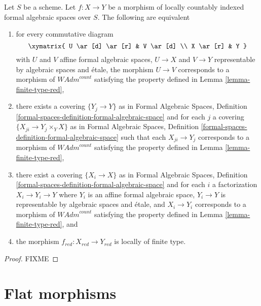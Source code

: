 \begin{lemma}
\label{lemma-finite-type-red-morphisms}
Let $S$ be a scheme. Let $f : X \to Y$ be a morphism of
locally countably indexed formal algebraic spaces over $S$.
The following are equivalent
\begin{enumerate}
\item for every commutative diagram
$$
\xymatrix{
U \ar[d] \ar[r] & V \ar[d] \\
X \ar[r] & Y
}
$$
with $U$ and $V$ affine formal algebraic spaces, $U \to X$ and $V \to Y$
representable by algebraic spaces and \'etale, the morphism $U \to V$
corresponds to a morphism of $\textit{WAdm}^{count}$ satisfying the
property defined in Lemma \ref{lemma-finite-type-red},
\item there exists a covering $\{Y_j \to Y\}$ as in
Formal Algebraic Spaces,
Definition \ref{formal-spaces-definition-formal-algebraic-space}
and for each $j$
a covering $\{X_{ji} \to Y_j \times_Y X\}$ as in
Formal Algebraic Spaces,
Definition \ref{formal-spaces-definition-formal-algebraic-space}
such that each $X_{ji} \to Y_j$  corresponds
to a morphism of $\textit{WAdm}^{count}$ satisfying the
property defined in Lemma \ref{lemma-finite-type-red},
\item there exist a covering $\{X_i \to X\}$ as in
Formal Algebraic Spaces,
Definition \ref{formal-spaces-definition-formal-algebraic-space}
and for each $i$ a factorization $X_i \to Y_i \to Y$ where $Y_i$
is an affine formal algebraic space, $Y_i \to Y$ is representable
by algebraic spaces and \'etale, and $X_i \to Y_i$ corresponds
to a morphism of $\textit{WAdm}^{count}$ satisfying the
property defined in Lemma \ref{lemma-finite-type-red}, and
\item the morphism $f_{red} : X_{red} \to Y_{red}$ is locally of finite type.
\end{enumerate}
\end{lemma}

\begin{proof}
FIXME
\end{proof}


















\section{Flat morphisms}
\label{section-flat}

